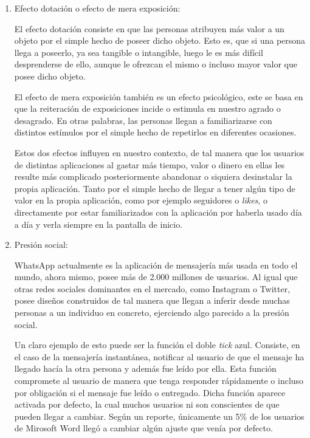 \begin{enumerate}
    El creador de dicha herramienta, Raskin, expuso en una entrevista su arrepentimiento de haber creado algo tan adictivo \footnote{Raskin además de admitir que nunca pudo predecir lo adictivo que su invento podría ser, también comentó que él mismo está usando un filtro monocromático en su dispositivo móvil para minimizar lo adictivo que puede llegar a ser tener tantos estímulos en la pantalla.}. Su intención era más bien intentar innovar las interfaces que volver a las personas tan adictivas. \cite{Social-Deliberately}

    \item Efecto dotación o efecto de mera exposición:

    El efecto dotación consiste en que las personas atribuyen más valor a un objeto por el simple hecho de poseer dicho objeto. Esto es, que si una persona llega a poseerlo, ya sea tangible o intangible, luego le es más difícil desprenderse de ello, aunque le ofrezcan el mismo o incluso mayor valor que posee dicho objeto.

    El efecto de mera exposición también es un efecto psicológico, este se basa en que la reiteración de exposiciones incide o estimula en nuestro agrado o desagrado. En otras palabras, las personas llegan a familiarizarse con distintos estímulos por el simple hecho de repetirlos en diferentes ocasiones.

    Estos dos efectos influyen en nuestro contexto, de tal manera que los usuarios de distintas aplicaciones al gastar más tiempo, valor o dinero en ellas les resulte más complicado posteriormente abandonar o siquiera desinstalar la propia aplicación. Tanto por el simple hecho de llegar a tener algún tipo de valor en la propia aplicación, como por ejemplo seguidores o \textit{likes}, o directamente por estar familiarizados con la aplicación por haberla usado día a día y verla siempre en la pantalla de inicio.

    \item Presión social:

    WhatsApp actualmente es la aplicación de mensajería más usada en todo el mundo, ahora mismo, posee más de 2.000 millones de usuarios. \cite{Adiccion-RRSS-WhatsApp} Al igual que otras redes sociales dominantes en el mercado, como Instagram o Twitter, posee diseños construidos de tal manera que llegan a inferir desde muchas personas a un individuo en concreto, ejerciendo algo parecido a la presión social.

    Un claro ejemplo de esto puede ser la función el doble \textit{tick} azul. Consiste, en el caso de la mensajería instantánea, notificar al usuario de que el mensaje ha llegado hacía la otra persona y además fue leído por ella. Esta función compromete al usuario de manera que tenga responder rápidamente o incluso por obligación si el mensaje fue leído o entregado. Dicha función aparece activada por defecto, la cual muchos usuarios ni son conscientes de que pueden llegar a cambiar. Según un reporte, únicamente un 5\% de los usuarios de Mirosoft Word llegó a cambiar algún ajuste que venía por defecto. \cite{Adiccion-RRSS-Settings}


\end{enumerate}
